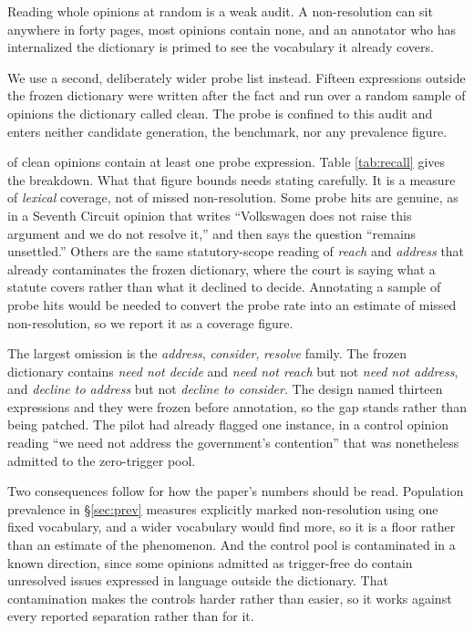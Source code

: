 Reading whole opinions at random is a weak audit. A non-resolution can sit
anywhere in forty pages, most opinions contain none, and an annotator who has
internalized the dictionary is primed to see the vocabulary it already
covers.

We use a second, deliberately wider probe list instead. Fifteen expressions
outside the frozen dictionary were written after the fact and run over a random
sample of \RecallSampled{} opinions the dictionary called clean. The probe is
confined to this audit and enters neither candidate generation, the benchmark,
nor any prevalence figure.

\RecallHit{} of clean opinions contain at least one probe expression. Table
\ref{tab:recall} gives the breakdown. What that figure bounds needs stating
carefully. It is a measure of \emph{lexical} coverage, not of missed
non-resolution. Some probe hits are genuine, as in a Seventh Circuit opinion
that writes ``Volkswagen does not raise this argument and we do not resolve
it,'' and then says the question ``remains unsettled.'' Others are the same
statutory-scope reading of \emph{reach} and \emph{address} that already
contaminates the frozen dictionary, where the court is saying what a statute
covers rather than what it declined to decide. Annotating a sample of probe hits would be needed to convert the probe rate
into an estimate of missed non-resolution, so we report it as a coverage
figure.

The largest omission is the \emph{address}, \emph{consider}, \emph{resolve}
family. The frozen dictionary contains \emph{need not decide} and \emph{need not
reach} but not \emph{need not address}, and \emph{decline to address} but not
\emph{decline to consider}. The design named thirteen expressions and they were
frozen before annotation, so the gap stands rather than being patched. The pilot
had already flagged one instance, in a control opinion reading ``we need not
address the government's contention'' that was nonetheless admitted to the
zero-trigger pool.

Two consequences follow for how the paper's numbers should be read. Population
prevalence in \S\ref{sec:prev} measures explicitly marked non-resolution using
one fixed vocabulary, and a wider vocabulary would find more, so it is a floor
rather than an estimate of the phenomenon. And the control pool is contaminated
in a known direction, since some opinions admitted as trigger-free do contain
unresolved issues expressed in language outside the dictionary. That
contamination makes the controls harder rather than easier, so it works against
every reported separation rather than for it.


